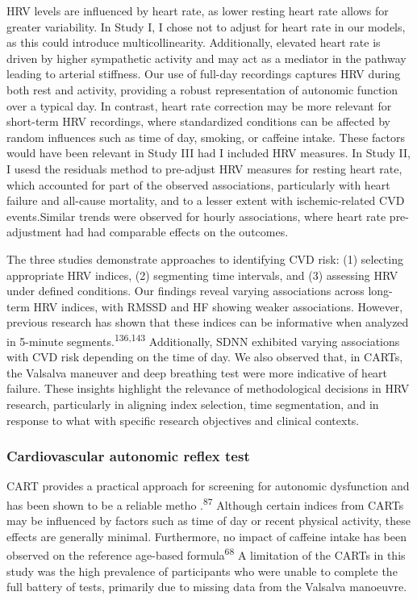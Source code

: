 \documentclass[
  letterpaper,
  headsepline=true,
  open=any]{scrbook}
\begin{document}
HRV levels are influenced by heart rate, as lower resting heart rate
allows for greater variability. In Study I, I chose not to adjust for
heart rate in our models, as this could introduce multicollinearity.
Additionally, elevated heart rate is driven by higher sympathetic
activity and may act as a mediator in the pathway leading to arterial
stiffness. Our use of full-day recordings captures HRV during both rest
and activity, providing a robust representation of autonomic function
over a typical day. In contrast, heart rate correction may be more
relevant for short-term HRV recordings, where standardized conditions
can be affected by random influences such as time of day, smoking, or
caffeine intake. These factors would have been relevant in Study III had
I included HRV measures. In Study II, I usesd the residuals method to
pre-adjust HRV measures for resting heart rate, which accounted for part
of the observed associations, particularly with heart failure and
all-cause mortality, and to a lesser extent with ischemic-related CVD
events.Similar trends were observed for hourly associations, where heart
rate pre-adjustment had had comparable effects on the outcomes.

The three studies demonstrate approaches to identifying CVD risk: (1)
selecting appropriate HRV indices, (2) segmenting time intervals, and
(3) assessing HRV under defined conditions. Our findings reveal varying
associations across long-term HRV indices, with RMSSD and HF showing
weaker associations. However, previous research has shown that these
indices can be informative when analyzed in 5-minute
segments.\textsuperscript{136,143} Additionally, SDNN exhibited varying
associations with CVD risk depending on the time of day. We also
observed that, in CARTs, the Valsalva maneuver and deep breathing test
were more indicative of heart failure. These insights highlight the
relevance of methodological decisions in HRV research, particularly in
aligning index selection, time segmentation, and in response to what
with specific research objectives and clinical contexts.

\hypertarget{cardiovascular-autonomic-reflex-test}{%
\subsubsection{Cardiovascular autonomic reflex
test}\label{cardiovascular-autonomic-reflex-test}}

CART provides a practical approach for screening for autonomic
dysfunction and has been shown to be a reliable metho
.\textsuperscript{87} Although certain indices from CARTs may be
influenced by factors such as time of day or recent physical activity,
these effects are generally minimal. Furthermore, no impact of caffeine
intake has been observed on the reference age-based
formula\textsuperscript{68} A limitation of the CARTs in this study was
the high prevalence of participants who were unable to complete the full
battery of tests, primarily due to missing data from the Valsalva
manoeuvre.
\end{document}
